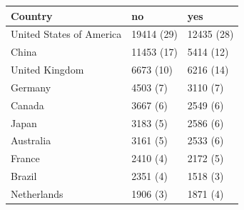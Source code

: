 \begin{table}[ht]
\centering
\begin{tabular}{lll}
 Country & no & yes \\ 
  \hline
United States of America & 19414 (29) & 12435 (28) \\ 
  China & 11453 (17) & 5414 (12) \\ 
  United Kingdom & 6673 (10) & 6216 (14) \\ 
  Germany & 4503 (7) & 3110 (7) \\ 
  Canada & 3667 (6) & 2549 (6) \\ 
  Japan & 3183 (5) & 2586 (6) \\ 
  Australia & 3161 (5) & 2533 (6) \\ 
  France & 2410 (4) & 2172 (5) \\ 
  Brazil & 2351 (4) & 1518 (3) \\ 
  Netherlands & 1906 (3) & 1871 (4) \\ 
  \end{tabular}
\end{table}
